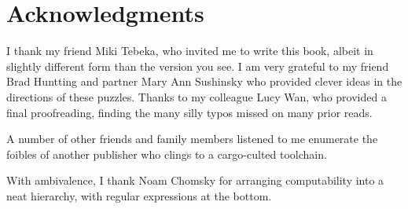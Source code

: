 \hypertarget{acknowledgments}{%
\chapter{Acknowledgments}\label{acknowledgments}}

I thank my friend Miki Tebeka, who invited me to write this book, albeit
in slightly different form than the version you see. I am very grateful
to my friend Brad Huntting and partner Mary Ann Sushinsky who provided
clever ideas in the directions of these puzzles. Thanks to my colleague
Lucy Wan, who provided a final proofreading, finding the many silly
typos missed on many prior reads.

A number of other friends and family members listened to me enumerate
the foibles of another publisher who clings to a cargo-culted toolchain.

With ambivalence, I thank Noam Chomsky for arranging computability into
a neat hierarchy, with regular expressions at the bottom.

\newpage

